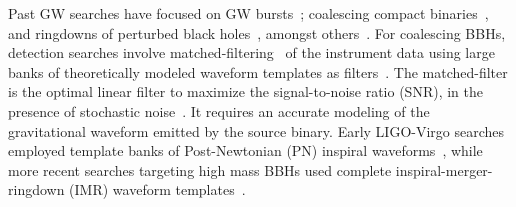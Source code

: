 Past GW searches  have focused on GW bursts~\cite{Abadie:2010mt,
Abadie:2010wx,Abadie:2012rq}; coalescing compact
binaries~\cite{Colaboration:2011nz,Abadie:2010yb,Abbott:2009qj,
Abbott:2009tt,Messaritaki:2005wv,Abadie:2011kd,Aasi:2012rja},
and ringdowns of perturbed black holes~\cite{Abbott:2009km}, amongst
others~\cite{Abbott:2003yq,Abbott:2005pu,Sintes:2005fp,Abadie:2011md,
Palomba:2012wn}. For coalescing BBHs, detection searches involve 
matched-filtering~\cite{Wainstein:1962,Allen:2005fk} of the instrument
data using large banks of theoretically modeled waveform templates
as filters~\cite{Sathyaprakash:1991mt,SathyaMetric2PN,OwenTemplateSpacing,
BabaketalBankPlacement,SathyaBankPlacementTauN,Cokelaer:2007kx}.
The matched-filter is the optimal linear filter to maximize the
signal-to-noise ratio (SNR), in the presence of stochastic 
noise~\cite{1057571}. It requires an accurate modeling of the gravitational 
waveform emitted by the source binary. Early LIGO-Virgo searches 
employed template banks of Post-Newtonian (PN) inspiral 
waveforms~\cite{Colaboration:2011nz,Abadie:2010yb,Abbott:2009qj,
Abbott:2009tt,Messaritaki:2005wv}, while more recent
searches targeting high mass BBHs used complete inspiral-merger-ringdown
(IMR) waveform templates~\cite{Abadie:2011kd,Aasi:2012rja}. 


